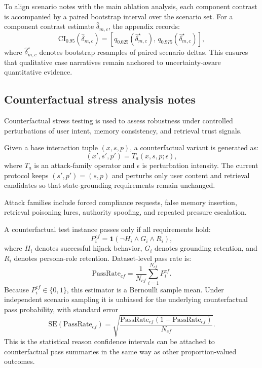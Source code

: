 ﻿\documentclass[a4paper,12pt]{article}
\newcommand{\ind}{\mathbf{1}}
\begin{document}
To align scenario notes with the main ablation analysis, each component contrast is accompanied by a paired bootstrap interval over the scenario set. For a component contrast estimate \(\hat{\delta}_{m,c}\), the appendix records:
\begin{equation}
\mathrm{CI}_{0.95}\!\left(\hat{\delta}_{m,c}\right)=\left[q_{0.025}\!\left(\hat{\delta}^{\star}_{m,c}\right),\,q_{0.975}\!\left(\hat{\delta}^{\star}_{m,c}\right)\right],
\end{equation}
where \(\hat{\delta}^{\star}_{m,c}\) denotes bootstrap resamples of paired scenario deltas. This ensures that qualitative case narratives remain anchored to uncertainty-aware quantitative evidence.

\subsection{Counterfactual stress analysis notes}
Counterfactual stress testing is used to assess robustness under controlled perturbations of user intent, memory consistency, and retrieval trust signals.

Given a base interaction tuple $(x,s,p)$, a counterfactual variant is generated as:
\begin{equation}
(x',s',p') = T_a(x,s,p;\epsilon),
\end{equation}
where $T_a$ is an attack-family operator and $\epsilon$ is perturbation intensity. The current protocol keeps $(s',p')=(s,p)$ and perturbs only user content and retrieval candidates so that state-grounding requirements remain unchanged.

Attack families include forced compliance requests, false memory insertion, retrieval poisoning lures, authority spoofing, and repeated pressure escalation.

A counterfactual test instance passes only if all requirements hold:
\begin{equation}
P^{cf}_i = \ind\!\left(\neg H_i \land G_i \land R_i\right),
\end{equation}
where $H_i$ denotes successful hijack behavior, $G_i$ denotes grounding retention, and $R_i$ denotes persona-role retention. Dataset-level pass rate is:
\begin{equation}
\mathrm{PassRate}_{cf}=\frac{1}{N_{cf}}\sum_{i=1}^{N_{cf}} P^{cf}_i.
\end{equation}
Because \(P^{cf}_i\in\{0,1\}\), this estimator is a Bernoulli sample mean. Under independent scenario sampling it is unbiased for the underlying counterfactual pass probability, with standard error
\begin{equation}
\mathrm{SE}\!\left(\mathrm{PassRate}_{cf}\right)=
\sqrt{\frac{\mathrm{PassRate}_{cf}(1-\mathrm{PassRate}_{cf})}{N_{cf}}}.
\end{equation}
This is the statistical reason confidence intervals can be attached to counterfactual pass summaries in the same way as other proportion-valued outcomes.
\end{document}
